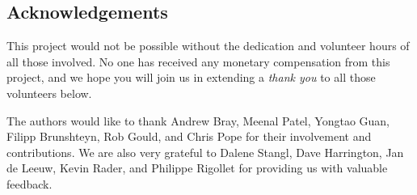 

\subsection*{Acknowledgements}

This project would not be possible without the dedication and volunteer hours of all those involved. No one has received any monetary compensation from this project, and we hope you will join us in extending a \emph{thank you} to all those volunteers below.

The authors would like to thank Andrew Bray, Meenal Patel, Yongtao Guan, Filipp Brunshteyn, Rob Gould, and Chris Pope for their involvement and contributions. %
We are also very grateful to Dalene Stangl, Dave Harrington, Jan de Leeuw, Kevin Rader, and Philippe Rigollet for providing us with valuable feedback.



